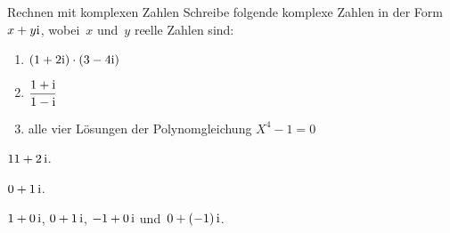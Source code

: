 \documentclass{algblatt}
\begin{document}
\begin{aufgabe}{Rechnen mit komplexen Zahlen}
Schreibe folgende komplexe Zahlen in der Form~$x + y \mathrm{i}$, wobei~$x$ und~$y$
reelle Zahlen sind:
\begin{enumerate}
\item $(1 + 2 \mathrm{i}) \cdot (3 - 4 \mathrm{i})$
\item $\dfrac{1 + \mathrm{i}}{1 - \mathrm{i}}$
\item alle vier Lösungen der Polynomgleichung $X^4 - 1 = 0$
\end{enumerate}

\begin{loesungE}
\item $11 + 2 \, \mathrm{i}$.
\item $0 + 1 \, \mathrm{i}$.
\item $1 + 0 \, \mathrm{i}$, $0 + 1 \, \mathrm{i}$, $-1 + 0 \, \mathrm{i}$ und~$0 + (-1) \, \mathrm{i}$.
\end{loesungE}
\end{aufgabe}
\end{document}
